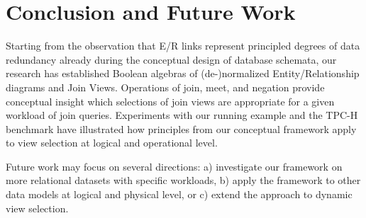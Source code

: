\documentclass[sigconf]{acmart}
\begin{document}

\section{Conclusion and Future Work}\label{sec:conclusion}

Starting from the observation that E/R links represent principled degrees of data redundancy already during the conceptual design of database schemata, our research has established Boolean algebras of (de-)normalized Entity/Relationship diagrams and Join Views. Operations of join, meet, and negation provide conceptual insight which selections of join views are appropriate for a given workload of join queries. Experiments with our running example and the TPC-H benchmark have illustrated how principles from our conceptual framework apply to view selection at logical and operational level.

Future work may focus on several directions: a) investigate our framework on more relational datasets with specific workloads, b) apply the framework to other data models at logical and physical level, or c) extend the approach to dynamic view selection.
\end{document}
